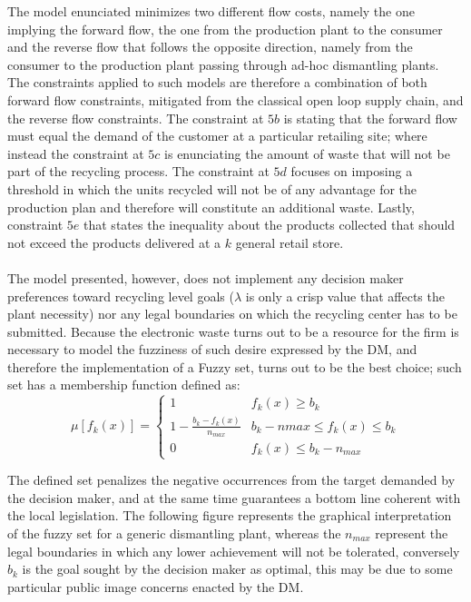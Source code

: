 \begin{doublespace}
The model enunciated minimizes two different flow costs, namely the one implying the forward flow, the one from the production plant to the consumer and the reverse flow that follows the opposite direction, namely from the consumer to the production plant passing through ad-hoc dismantling plants. The constraints applied to such models are therefore a combination of both forward flow constraints, mitigated from the classical open loop supply chain, and the reverse flow constraints. The constraint at $5b$ is stating that the forward flow must equal the demand of the customer at a particular retailing site; where instead the constraint at $5c$ is enunciating the amount of waste that will not be part of the recycling process. The constraint at $5d$ focuses on imposing a threshold in which the units recycled will not be of any advantage for the production plan and therefore will constitute an additional waste. Lastly, constraint $5e$ that states the inequality about the products collected that should not exceed the products delivered at a $k$ general retail store. 
\\
\\
The model presented, however, does not implement any decision maker preferences toward recycling level goals ($\lambda$ is only a crisp value that affects the plant necessity) nor any legal boundaries on which the recycling center has to be submitted. Because the electronic waste turns out to be a resource for the firm is necessary to model the fuzziness of such desire expressed by the DM, and therefore the implementation of a Fuzzy set\cite{Zadeh_1965}, turns out to be the best choice; such set has a membership function defined as:
$$
\mu [f_k(x)]=
\begin{cases}
1 & f_k(x) \geq b_k \\
1-\frac{b_k-f_k(x)}{n_{max}} & b_k -n{max} \leq f_k(x) \leq b_k \\
0 & f_k(x) \leq b_k - n_{max}
\end{cases}
$$

The defined set penalizes the negative occurrences from the target demanded by the decision maker, and at the same time guarantees a bottom line coherent with the local legislation. The following figure represents the graphical interpretation of the fuzzy set for a generic dismantling plant, whereas the $n_{max}$ represent the legal boundaries in which any lower achievement will not be tolerated, conversely $b_k$ is the goal sought by the decision maker as optimal, this may be due to some particular public image concerns enacted by the DM. 


\end{doublespace}
